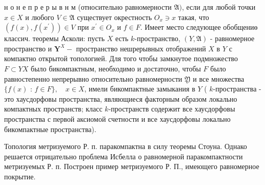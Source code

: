 \documentclass[10pt]{article}
\begin{document}
н о н е п р е р ы в н м (относительно равномерности $\mathfrak{A})$, если для любой точки $x \in X$ и любого $V \in \mathfrak{A}$ существует окрестность $O_{x} \ni x$ такая, что $\left(f(x), f\left(x^{\prime}\right)\right) \in V$ при $x^{\prime} \in O_{x}$ и $f \in F$. Имеет место следующее обобщениө классич. теоремы Асколи: пусть $X$ есть $k$-пространство, $(Y, \mathfrak{A})$ - равномерное пространство и $\boldsymbol{Y}^{X}-$ пространство нешрерывных отображений $X$ в $Y$ с компактно открытой топологией. Для того чтобы замкнутое подмножество $F \subset Y X$ было бикомпактным, необходимо и достаточно, чтобы $F$ было равностепенно непрерывно относительно равномерности $\mathfrak{Y}$ и все множества $\{f(x)$ : $f \in F\}, \quad x \in X$, имели бикомпактные замыкания в $Y$ ( $k$-пространства - это хаусдорфовы пространства, являющиеся факторным образом локально компактных пространств; класс $k$-пространств содержит все хаусдорфовы пространства с первой аксиомой счетности и все хаусдорфовы локально бикомпактные пространства).



Топология метризуемого Р. п. паракомпактна в силу теоремы Стоуна. Однако решается отрицательно проблема Исбелла о равномерной паракомпактности метризуемых Р. п. Построен пример метризуемого Р. П., имеющего равномерное покрытие.
\end{document}
